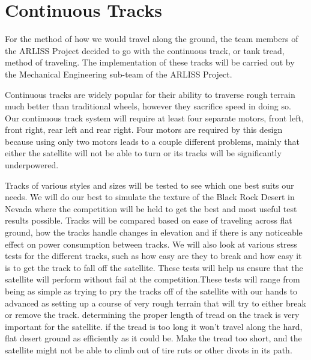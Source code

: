 \documentclass[10pt,letterpaper,onecolumn,journal]{IEEEtran}
\begin{document}
\section{Continuous Tracks}
\par
For the method of how we would travel along the ground, the team members of the ARLISS Project decided to go with the continuous track, or tank tread, method of traveling. The implementation of these tracks will be carried out by the Mechanical Engineering sub-team of the ARLISS Project.\vspace{.3cm}
\par
Continuous tracks are widely popular for their ability to traverse rough terrain much better than traditional wheels, however they sacrifice speed in doing so. Our continuous track system will require at least four separate motors, front left, front right, rear left and rear right. Four motors are required by this design because using only two motors leads to a couple different problems, mainly that either the satellite will not be able to turn or its tracks will be significantly underpowered.\vspace{.3cm}
\par
Tracks of various styles and sizes will be tested to see which one best suits our needs. We will do our best to simulate the texture of the Black Rock Desert in Nevada where the competition will be held to get the best and most useful test results possible. Tracks will be compared based on ease of traveling across flat ground, how the tracks handle changes in elevation and if there is any noticeable effect on power consumption between tracks. We will also look at various stress tests for the different tracks, such as how easy are they to break and how easy it is to get the track to fall off the satellite. These tests will help us ensure that the satellite will perform without fail at the competition.These tests will range from being as simple as trying to pry the tracks off of the satellite with our hands to advanced as setting up a course of very rough terrain that will try to either break or remove the track. determining the proper length of tread on the track is very important for the satellite. if the tread is too long it won't travel along the hard, flat desert ground as efficiently as it could be. Make the tread too short, and the satellite might not be able to climb out of tire ruts or other divots in its path. \vspace{.3cm}
\par
\end{document}
